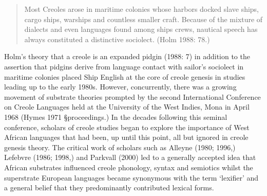 \begin{quotation}
Most Creoles arose in maritime colonies whose harbors docked slave ships, cargo ships, warships and countless smaller craft. Because of the mixture of dialects and even languages found among ships{\textquotesingle} crews, nautical speech has always constituted a distinctive sociolect. (Holm 1988: 78.) 

\end{quotation}
\begin{styleStandard}
Holm’s theory that a creole is an expanded pidgin (1988: 7) in addition to the assertion that pidgins derive from language contact with sailor’s sociolect in maritime colonies placed Ship English at the core of creole genesis in studies leading up to the early 1980s. However, concurrently, there was a growing movement of substrate theories prompted by the second International Conference on Creole Languages held at the University of the West Indies, Mona in April 1968 (Hymes 1971 §proceedings.) In the decades following this seminal conference, scholars of creole studies began to explore the importance of West African languages that had been, up until this point, all but ignored in creole genesis theory. The critical work of scholars such as Alleyne (1980; 1996,) Lefebvre (1986; 1998,) and Parkvall (2000) led to a generally accepted idea that African substrates influenced creole phonology, syntax and semiotics whilst the superstrate European languages became synonymous with the term ‘lexifier’ and a general belief that they predominantly contributed lexical forms.
\end{styleStandard}


